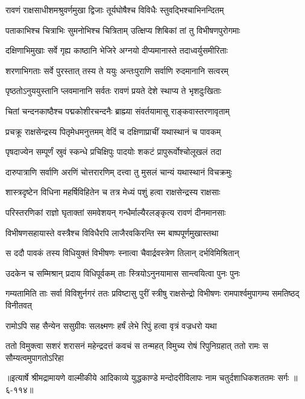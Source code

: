 \twolineshloka
{रावणं राक्षसाधीशमश्रुवर्णमुखा द्विजाः}
{तूर्यघोषैश्च विविधैः स्तुवद्भिश्चाभिनन्दितम्} %

\twolineshloka
{पताकाभिश्च चित्राभिः सुमनोभिश्च चित्रिताम्}
{उत्क्षिप्य शिबिकां तां तु विभीषणपुरोगमाः} %

\twolineshloka
{दक्षिणाभिमुखाः सर्वे गृह्य काष्ठानि भेजिरे}
{अग्नयो दीप्यमानास्ते तदाध्वर्युसमीरिताः} %

\twolineshloka
{शरणाभिगताः सर्वे पुरस्तात् तस्य ते ययुः}
{अन्तःपुराणि सर्वाणि रुदमानानि सत्वरम्} %

\twolineshloka
{पृष्ठतोऽनुययुस्तानि प्लवमानानि सर्वतः}
{रावणं प्रयते देशे स्थाप्य ते भृशदुःखिताः} %

\twolineshloka
{चितां चन्दनकाष्ठैश्च पद्मकोशीरचन्दनैः}
{ब्राह्म्या संवर्तयामासू राङ्कवास्तरणावृताम्} %

\twolineshloka
{प्रचक्रू राक्षसेन्द्रस्य पितृमेधमनुत्तमम्}
{वेदिं च दक्षिणाप्राचीं यथास्थानं च पावकम्} %

\twolineshloka
{पृषदाज्येन सम्पूर्णं स्रुवं स्कन्धे प्रचिक्षिपुः}
{पादयोः शकटं प्रापुरूर्वोश्चोलूखलं तदा} %

\twolineshloka
{दारुपात्राणि सर्वाणि अरणिं चोत्तरारणिम्}
{दत्त्वा तु मुसलं चान्यं यथास्थानं विचक्रमुः} %

\twolineshloka
{शास्त्रदृष्टेन विधिना महर्षिविहितेन च}
{तत्र मेध्यं पशुं हत्वा राक्षसेन्द्रस्य राक्षसाः} %

\twolineshloka
{परिस्तरणिकां राज्ञो घृताक्तां समवेशयन्}
{गन्धैर्माल्यैरलङ्कृत्य रावणं दीनमानसाः} %

\twolineshloka
{विभीषणसहायास्ते वस्त्रैश्च विविधैरपि}
{लाजैरवकिरन्ति स्म बाष्पपूर्णमुखास्तथा} %

\twolineshloka
{स ददौ पावकं तस्य विधियुक्तं विभीषणः}
{स्नात्वा चैवार्द्रवस्त्रेण तिलान् दर्भविमिश्रितान्} %

\twolineshloka
{उदकेन च सम्मिश्रान् प्रदाय विधिपूर्वकम्}
{ताः स्त्रियोऽनुनयामास सान्त्वयित्वा पुनः पुनः} %

\threelineshloka
{गम्यतामिति ताः सर्वा विविशुर्नगरं ततः}
{प्रविष्टासु पुरीं स्त्रीषु राक्षसेन्द्रो विभीषणः}
{रामपार्श्वमुपागम्य समतिष्ठद् विनीतवत्} %

\twolineshloka
{रामोऽपि सह सैन्येन ससुग्रीवः सलक्ष्मणः}
{हर्षं लेभे रिपुं हत्वा वृत्रं वज्रधरो यथा} %

\twolineshloka
{ततो विमुक्त्वा सशरं शरासनं महेन्द्रदत्तं कवचं स तन्महत्}
{विमुच्य रोषं रिपुनिग्रहात् ततो रामः स सौम्यत्वमुपागतोऽरिहा} %


॥इत्यार्षे श्रीमद्रामायणे वाल्मीकीये आदिकाव्ये युद्धकाण्डे मन्दोदरीविलापः नाम चतुर्दशाधिकशततमः सर्गः ॥६-११४॥
